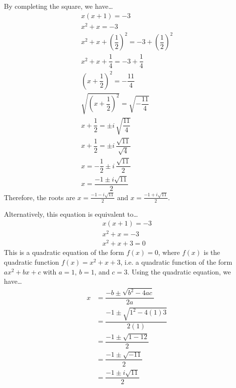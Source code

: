 \documentclass[11pt,letterpaper]{article}
\begin{document}
\sol By completing the square, we have\dots
	\[
	\begin{gathered}
	x(x + 1)= -3 \\
	x^2 + x= -3 \\
	x^2 + x + \left( \dfrac{1}{2} \right)^2= -3 + \left( \dfrac{1}{2} \right)^2 \\
	x^2 + x + \dfrac{1}{4}= -3 + \dfrac{1}{4} \\
	\left(x + \dfrac{1}{2} \right)^2= - \dfrac{11}{4} \\
	\sqrt{\left(x + \dfrac{1}{2} \right)^2}= \sqrt{- \dfrac{11}{4}} \\
	x + \dfrac{1}{2}= \pm i\, \sqrt{\dfrac{11}{4}} \\
	x + \dfrac{1}{2}= \pm i\, \dfrac{\sqrt{11}}{\sqrt{4}} \\
	x= - \dfrac{1}{2} \pm i\, \dfrac{\sqrt{11}}{2} \\
	x= \dfrac{-1 \pm i \sqrt{11}}{2}
	\end{gathered}
	\]
Therefore, the roots are $x= \frac{-1 - i \sqrt{11}}{2}$ and $x= \frac{-1 + i \sqrt{11}}{2}$. \pspace

Alternatively, this equation is equivalent to\dots
	\[
	\begin{gathered}
	x(x + 1)= -3 \\
	x^2 + x= -3 \\
	x^2 + x + 3= 0 
	\end{gathered}
	\]
This is a quadratic equation of the form $f(x)= 0$, where $f(x)$ is the quadratic function $f(x)= x^2 + x + 3$, i.e. a quadratic function of the form $ax^2 + bx + c$ with $a= 1$, $b= 1$, and $c= 3$. Using the quadratic equation, we have\dots
	\[
	\begin{aligned}
	x&= \dfrac{-b \pm \sqrt{b^2 - 4ac}}{2a} \\
	&= \dfrac{-1 \pm \sqrt{1^2 - 4(1)3}}{2(1)} \\
	&= \dfrac{-1 \pm \sqrt{1 - 12}}{2} \\
	&= \dfrac{-1 \pm \sqrt{-11}}{2} \\
	&= \dfrac{-1 \pm i \sqrt{11}}{2}
	\end{aligned}
	\]
\end{document}

